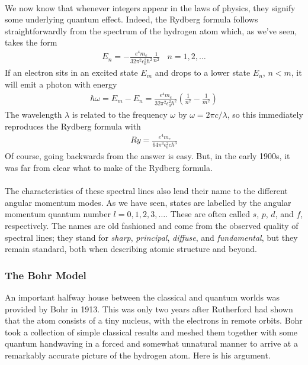 \documentclass[12pt]{article}
\def\be{\begin{eqnarray}}
\def\ee{\end{eqnarray}}
\newcommand{\nn}{\nonumber}
\newcommand\para{\paragraph{}}
\begin{document}
{\para
We now know that whenever integers appear in the laws of physics, they signify some underlying quantum effect. Indeed, the Rydberg formula follows straightforwardly from the spectrum of the hydrogen atom which, as we've seen, takes the form
%
\be E_n = -\frac{e^4 m_e}{32\pi^2\epsilon_0^2 \hbar^2} \frac{1}{n^2}\ \ \ \ n=1,2,\ldots \nn\ee
%
If an electron sits in an excited state $E_m$ and drops to a lower state $E_n$, $n<m$, it will emit a photon with energy
%
\be \hbar \omega  = E_m-E_n = \frac{e^4 m_e}{32\pi^2\epsilon_0^2 \hbar^2} \left(\frac{1}{n^2} - \frac{1}{m^2}\right)
\nn\ee
%
The wavelength $\lambda$ is related to the frequency $\omega$ by $\omega = 2\pi c/\lambda$, so this immediately reproduces the Rydberg formula with
%
\be Ry = \frac{e^4m_e}{64\pi^3 \epsilon_0^2 c \hbar^3}\nn\ee
%
Of course, going backwards from the answer is easy.  But, in the early 1900s, it was far from clear what to make of the Rydberg formula.



\para
The characteristics of these spectral lines also lend their name to the different angular momentum modes. As we have seen, states are labelled by the angular momentum quantum number $l=0,1,2,3,\ldots$. These are often called $s$, $p$, $d$, and $f$, respectively. The names are old fashioned and come from the observed quality of spectral lines; they stand for {\it sharp}, {\it principal}, {\it diffuse}, and {\it fundamental}, but they remain standard, both when describing atomic structure and beyond.

\subsubsection*{The Bohr Model}

An important halfway house between the classical and quantum worlds was provided by Bohr in 1913. This was only two years after Rutherford had shown that the atom consists of a tiny nucleus, with the electrons in remote orbits. Bohr took a collection of simple classical results and 
meshed them together with some quantum handwaving in a forced and somewhat unnatural manner to arrive at a remarkably accurate picture of the hydrogen atom. Here is his argument.

}
\end{document}
